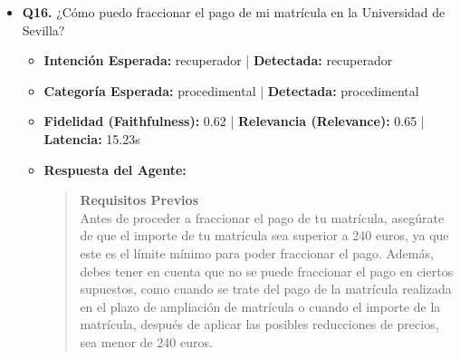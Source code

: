 \documentclass[12pt,a4paper,oneside]{report}
\begin{document}
\begin{itemize}
  
\item \textbf{Q16.} ¿Cómo puedo fraccionar el pago de mi matrícula en la Universidad de Sevilla? \\
        \begin{itemize}
          \item \textbf{Intención Esperada:} recuperador | \textbf{Detectada:} recuperador
          \item \textbf{Categoría Esperada:} procedimental | \textbf{Detectada:} procedimental
          \item \textbf{Fidelidad (Faithfulness):} 0.62 | \textbf{Relevancia (Relevance):} 0.65 | \textbf{Latencia:} 15.23s
          \item \textbf{{Respuesta del Agente:}} \\
                \begin{quote}

\noindent\textbf{Requisitos Previos}\\
Antes de proceder a fraccionar el pago de tu matrícula, asegúrate de que el importe de tu matrícula sea superior a 240 euros, ya que este es el límite mínimo para poder fraccionar el pago. Además, debes tener en cuenta que no se puede fraccionar el pago en ciertos supuestos, como cuando se trate del pago de la matrícula realizada en el plazo de ampliación de matrícula o cuando el importe de la matrícula, después de aplicar las posibles reducciones de precios, sea menor de 240 euros.



\end{quote}
\end{itemize}
\end{itemize}
\end{document}
